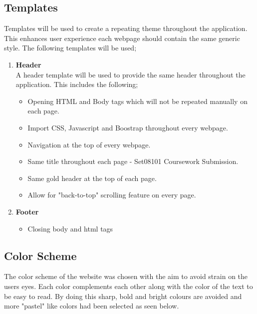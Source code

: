 \documentclass[10pt, a4paper]{article}
\begin{document}
	\subsection{Templates}
	Templates will be used to create a repeating theme throughout the application.  This enhances user experience each webpage should contain the same generic style. The following templates will be used;
	
	\begin{enumerate}
	\item \textbf{Header}\\
	A header template will be used to provide the same header throughout the application. This includes the following;
	\begin{itemize}
	\item Opening HTML and Body tags which will not be repeated manually on each page.
	\item Import CSS, Javascript and Boostrap throughout every webpage.
	\item Navigation at the top of every webpage.
	\item Same title throughout each page - Set08101 Coursework Submission.
	\item Same gold header at the top of each page.
	\item Allow for "back-to-top" scrolling feature on every page.
	\end{itemize}
	\item \textbf{Footer}
	\begin{itemize}
	\item Closing body and html tags
	\end{itemize}
	\end{enumerate}


	\subsection{Color Scheme}
	The color scheme of the website was chosen with the aim to avoid strain on the users eyes.  Each color complements each other along with the color of the text to be easy to read.  By doing this sharp, bold and bright colours are avoided and more "pastel" like colors had been selected as seen below.
      
\end{document}
